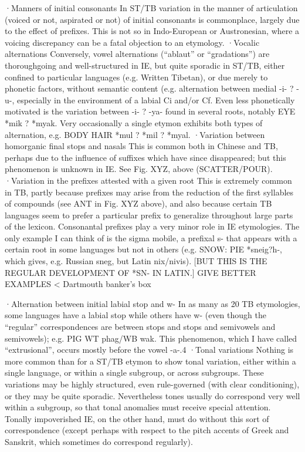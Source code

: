 ·Manners of initial consonants
In ST/TB variation in the manner of articulation (voiced or not, aspirated or not) of initial consonants is commonplace, largely due to the effect of prefixes. This is not so in Indo-European or Austronesian, where a voicing discrepancy can be a fatal objection to an etymology.
·Vocalic alternations
Conversely, vowel alternations (“ablaut” or “gradations”) are thoroughgoing and well-structured in IE, but quite sporadic in ST/TB, either confined to particular languages (e.g. Written Tibetan), or due merely to phonetic factors, without semantic content (e.g. alternation between medial -i-  ? -u-, especially in the environment of a labial Ci and/or Cf.  Even less phonetically motivated is the variation between -i- ? -ya- found in several roots, notably EYE *mik  ? *myak.  Very occasionally a single etymon exhibits both types of alternation, e.g. BODY HAIR *mul  ? *mil  ?  *myal.
·Variation between homorganic final stops and nasals
This is common both in Chinese and TB, perhaps due to the influence of suffixes which have since disappeared; but this phenomenon is unknown in IE.  See Fig. XYZ, above (SCATTER/POUR).
·Variation in the prefixes attested with a given root
This is extremely common in TB, partly because prefixes may arise from the reduction of the first syllables of compounds (see ANT in Fig. XYZ above), and also because certain TB languages seem to prefer a particular prefix to generalize throughout large parts of the lexicon.  Consonantal prefixes play a very minor role in IE etymologies. The only example I can think of is the sigma mobile, a prefixal s- that appears with a certain root in some languages but not in others (e.g. SNOW: PIE *sneig?h-, which gives, e.g. Russian sneg, but Latin nix/nivis). [BUT THIS IS THE REGULAR DEVELOPMENT OF *SN- IN LATIN.]
	GIVE BETTER EXAMPLES  < Dartmouth banker’s box

·Alternation between initial labial stop and w-
In as many as 20 TB etymologies, some languages have a labial stop while others have w- (even though the “regular” correspondences are between  stops and stops and semivowels and semivowels); e.g. PIG WT phag/WB wak.  This phenomenon, which I have called “extrusional”, occurs mostly before the vowel -a-.4
·Tonal variations
Nothing is more common than for a ST/TB etymon to show tonal variation, either within a single language, or within a single subgroup, or across subgroups.  These variations may be highly structured, even rule-governed (with clear conditioning), or they may be quite sporadic. Nevertheless tones usually do correspond very well within a subgroup, so that tonal anomalies must receive special attention. Tonally impoverished IE, on the other hand, must do without this sort of correspondence (except perhaps with respect to the pitch accents of Greek and Sanskrit, which sometimes do correspond regularly).

